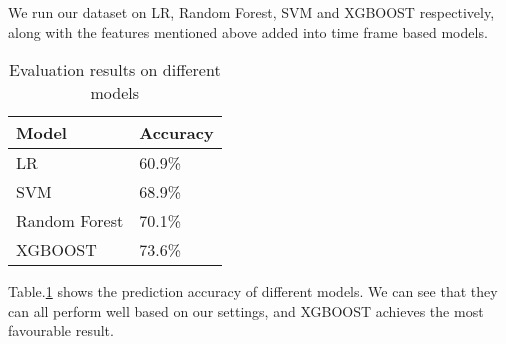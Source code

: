We run our dataset on LR, Random Forest, SVM and XGBOOST respectively, along with the features mentioned above added into time frame based models.
\begin{table}[htbp]
	\caption{Evaluation results on different models}
	\begin{center}
		\begin{tabular}{|l|l|}
			\hline
			Model & Accuracy\\
			\hline
			LR & 60.9\%\\
			\hline
			SVM & 68.9\%\\
			\hline
			Random Forest & 70.1\%\\
			\hline
			XGBOOST & 73.6\%\\
			\hline
		\end{tabular}
		\label{tab2}
	\end{center}
\end{table}
Table.\ref{tab2} shows the prediction accuracy of different models. We can see that they can all perform well based on our settings, and XGBOOST achieves the most favourable result.
